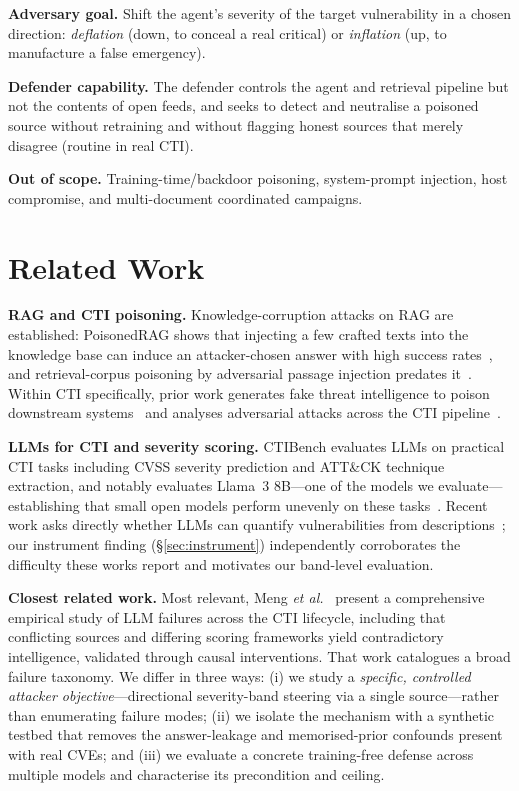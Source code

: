 \documentclass[conference]{IEEEtran}
\begin{document}
\textbf{Adversary goal.} Shift the agent's severity of the target vulnerability
in a chosen direction: \emph{deflation} (down, to conceal a real critical) or
\emph{inflation} (up, to manufacture a false emergency).

\textbf{Defender capability.} The defender controls the agent and retrieval
pipeline but not the contents of open feeds, and seeks to detect and neutralise a
poisoned source without retraining and without flagging honest sources that
merely disagree (routine in real CTI).

\textbf{Out of scope.} Training-time/backdoor poisoning, system-prompt injection,
host compromise, and multi-document coordinated campaigns.

\section{Related Work}\label{sec:related}

\textbf{RAG and CTI poisoning.} Knowledge-corruption attacks on RAG are
established: PoisonedRAG shows that injecting a few crafted texts into the
knowledge base can induce an attacker-chosen answer with high success
rates~\cite{zou2025poisonedrag}, and retrieval-corpus poisoning by adversarial
passage injection predates it~\cite{zhong2023poisoning}. Within CTI specifically,
prior work generates fake threat intelligence to poison downstream
systems~\cite{ranade2021generating} and analyses adversarial attacks across the
CTI pipeline~\cite{falsealarms2025}.

\textbf{LLMs for CTI and severity scoring.} CTIBench evaluates LLMs on practical
CTI tasks including CVSS severity prediction and ATT\&CK technique extraction,
and notably evaluates Llama~3 8B---one of the models we evaluate---establishing that small
open models perform unevenly on these tasks~\cite{alam2024ctibench}. Recent work
asks directly whether LLMs can quantify vulnerabilities from
descriptions~\cite{descriptiontoscore2025}; our instrument finding
(\S\ref{sec:instrument}) independently corroborates the difficulty these works
report and motivates our band-level evaluation.

\textbf{Closest related work.} Most relevant, Meng \emph{et al.}~\cite{meng2025uncovering} present
a comprehensive empirical study of LLM failures across the CTI lifecycle,
including that conflicting sources and differing scoring frameworks yield
contradictory intelligence, validated through causal interventions. That work
catalogues a broad failure taxonomy. We differ in three ways: (i) we study a
\emph{specific, controlled attacker objective}---directional severity-band
steering via a single source---rather than enumerating failure modes; (ii) we
isolate the mechanism with a synthetic testbed that removes the answer-leakage
and memorised-prior confounds present with real CVEs; and (iii) we evaluate a
concrete training-free defense across multiple models and characterise its precondition and ceiling.
\end{document}
